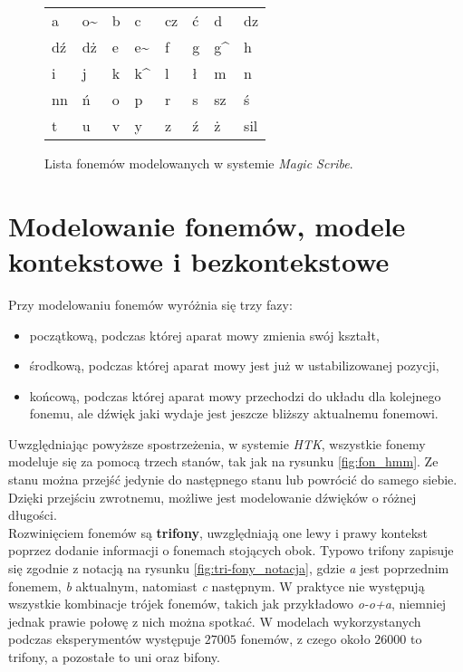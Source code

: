 \documentclass[shortabstract, mgr]{iithesis}
\begin{document}
		\begin{figure}
			\centering
			\begin{tabular}{|K{1cm}K{1cm}K{1cm}K{1cm}K{1cm}K{1cm}K{1cm}K{1cm}|}
				\hline
				a  & o\~ & b & c & cz & ć & d & dz \\ 
				dź & dż & e & e\~ & f & g & g\^ & h \\
				i & j & k & k\^ & l & ł & m & n \\
				nn & ń & o & p  & r & s & sz & ś \\
				t & u & v & y & z & ź & ż & sil \\
				\hline
			\end{tabular}
			\caption{\label{tab:phone_list}Lista fonemów modelowanych w systemie \textit{Magic Scribe}.}
		\end{figure}
 

	\section{ Modelowanie fonemów, modele kontekstowe i bezkontekstowe }
		\label{sec:trifones_definition}
		
		Przy modelowaniu fonemów wyróżnia się trzy fazy:
		\begin{itemize}
			\item początkową, podczas której aparat mowy zmienia swój kształt,
			\item środkową, podczas której aparat mowy jest już w ustabilizowanej pozycji,
			\item końcową, podczas której aparat mowy przechodzi do układu dla kolejnego fonemu, ale dźwięk jaki wydaje jest jeszcze bliższy aktualnemu fonemowi. 
		\end{itemize}
		Uwzględniając powyższe spostrzeżenia, w systemie \textit{HTK}, wszystkie fonemy modeluje się za pomocą trzech stanów, tak jak na rysunku \ref{fig:fon_hmm}. Ze stanu można przejść jedynie do następnego stanu lub powrócić do samego siebie. Dzięki przejściu zwrotnemu, możliwe jest modelowanie dźwięków o różnej długości. 
		\\
		Rozwinięciem fonemów są \textbf{trifony}, uwzględniają one lewy i prawy kontekst poprzez dodanie informacji o fonemach stojących obok. Typowo trifony zapisuje się zgodnie z notacją na rysunku \ref{fig:tri-fony_notacja}, gdzie \textit{a} jest poprzednim fonemem, \textit{b} aktualnym, natomiast \textit{c} następnym. W praktyce nie występują wszystkie kombinacje trójek fonemów, takich jak przykładowo \textit{o-o+a}, niemniej jednak prawie połowę z nich można spotkać. W modelach wykorzystanych podczas eksperymentów występuje $27005$ fonemów, z czego około $26000$ to trifony, a pozostałe to uni oraz bifony.
		
\end{document}
